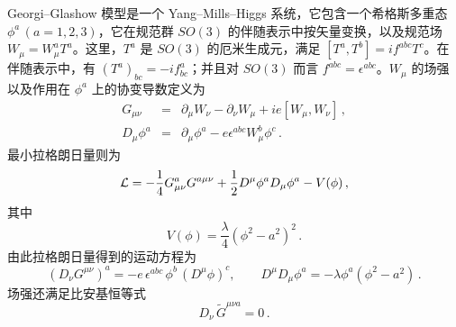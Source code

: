 Georgi–Glashow 模型是一个 Yang–Mills–Higgs 系统，它包含一个希格斯多重态 $\phi^a\,(a=1,2,3)$，它在规范群 $SO(3)$ 的伴随表示中按矢量变换，以及规范场 $W_\mu=W^a_\mu T^a$。这里，$T^a$ 是 $SO(3)$ 的厄米生成元，满足 $[T^a,T^b]=if^{abc}T^c$。在伴随表示中，有 $(T^a)_{bc}=-if^a_{bc}$；并且对 $SO(3)$ 而言 $f^{abc}=\epsilon^{abc}$。$W_\mu$ 的场强以及作用在 $\phi^a$ 上的协变导数定义为
\begin{eqnarray}
G_{\mu \nu} &=& \partial_{\mu}W_{\nu} - \partial_{\nu} W_{\mu} +
ie [W_{\mu},W_{\nu}]\,,
\nonumber\\
D_\mu\phi^a &=& \partial_\mu\phi^a - e\epsilon^{abc} W^b_\mu \phi^c\,.
\end{eqnarray}
最小拉格朗日量则为
\begin{equation}
{\cal L}  =  - \frac{1}{4} G^{a}_{\mu \nu} G^{a \mu \nu} +
\frac{1}{2} D^{\mu}\phi^a D_{\mu}\phi^a - V(\phi)\,,
\label{GGmodel}
\end{equation}
其中
\begin{equation}
V(\phi)=\frac{\lambda}{4}\left(\phi^2 - a^2 \right)^2\,.
\label{GGpot}
\end{equation}
由此拉格朗日量得到的运动方程为
\begin{equation}
(D_\nu G^{\mu \nu})^a=-e\,\epsilon^{abc}\,\phi^b\,(D^\mu\phi)^c,
\qquad D^\mu D_\mu \phi^a =-\lambda\phi^a (\phi^{2} - a^{2})\,. 
\label{XXIX}
\end{equation}
场强还满足比安基恒等式
\begin{equation}
D_\nu\,\widetilde G^{\mu \nu a} = 0\,.
\label{bianchi}
\end{equation}


